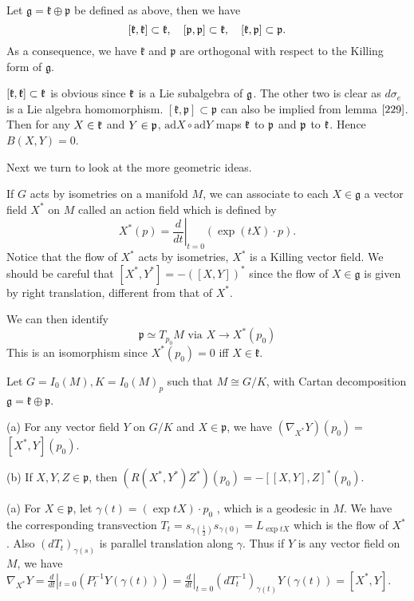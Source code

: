 \begin{proposition}
	Let $\mathfrak{g} = \mathfrak{k}\oplus\mathfrak{p}$ be
	defined as above, then we have
	\[
	[\mathfrak{k}, {\mathfrak k}] \subset \mathfrak{k},
	\quad[\mathfrak{p}, \mathfrak{p}] \subset \mathfrak{k},
	\quad[\mathfrak{k}, \mathfrak{p}] \subset \mathfrak{p}.
	\]
	As a consequence, we have $\mathfrak{k}$ and $\mathfrak{p}$
	are orthogonal with respect to the Killing
	form of $\mathfrak{g}$. 
\end{proposition}
\bproof
$[\mathfrak{k}, {\mathfrak k}] \subset \mathfrak{k}$ is obvious since
${\mathfrak k}$ is a Lie subalgebra of ${\mathfrak g}$. The other two is clear as
$d\sigma_{e}$ is a Lie algebra homomorphism. $[\mathfrak{k},
\mathfrak{p}] \subset \mathfrak{p}$ can also be implied from
lemma $\ref{229}$.  Then for any $X\in {\mathfrak k}$ and $Y\in {\mathfrak p}$,
$\mathrm{ad}X \circ \mathrm{ad}Y$ maps ${\mathfrak k}$ to ${\mathfrak p}$ and
${\mathfrak p}$ to ${\mathfrak k}$. Hence $B(X, Y) = 0$.
\eproof

Next we turn to look at the more geometric ideas.

If $G$ acts by isometries on a manifold $M$, we can associate to
each $X \in \mathfrak{g}$ a vector field $X^{*}$ on $M$ called an
action field which is defined by
\[
X^{*}(p) = \left.\frac{d}{d t}\right|_{t=0}(\exp (t X) \cdot p) .
\]
Notice that the flow of $X^*$ acts by isometries, $X^*$ is a
Killing vector field. We should be careful that $\left[X^{*},
Y^{*}\right] = -([X, Y])^{*}$ since  the flow of $X \in
\mathfrak{g}$ is given by right translation, different from that
of $X^*$. 

We can then identify
\[
\mathfrak{p} \simeq T_{p_{0}} M \text { via } X \rightarrow
X^{*}\left(p_{0}\right)
\]
This is an isomorphism since $X^{*}\left(p_{0}\right) = 0$ iff $X
\in \mathfrak{k}$.

\begin{proposition}\label{geo}
	Let $G = I_0(M), K = I_0(M)_p$ such that $M\cong G/K$, with
	Cartan decomposition $\mathfrak{g} = \mathfrak{k} \oplus
	\mathfrak{p}$.
	
	(a) For any vector field $Y$ on $G / K$ and $X \in
	\mathfrak{p}$, we have $\left( \nabla_{X^*}  Y \right)\left(
	p_{0} \right)=$
	$\left[ X^{*}, Y \right]\left( p_{0} \right) .$
	
	(b) If $X, Y, Z \in \mathfrak{p}$, then $\left( R\left(
	X^{*}, Y^{*} \right) Z^{*} \right)\left( p_{0} \right)=-[[X,
	Y], Z]^{*}\left( p_{0} \right)$.
\end{proposition}
\bproof
(a) For $X \in \mathfrak{p}$, let $\gamma(t)=(\exp t X) \cdot
p_{0}$ , which is a geodesic in $M$. We have the corresponding
transvection $T_{t}=s_{\gamma(\frac{1}{2})} s_{\gamma(0)} =
{L_{\exp t X}}$ which is the flow of $X^*$.  Also $\left(d
T_{t}\right)_{\gamma(s)}$
 is parallel translation along $\gamma$.  Thus if $ Y$  is any
 vector field on $M$, we have  $\nabla_{X^*} Y = \frac{d}{d
 t}|_{t=0} \left( P_{t}^{-1} Y(\gamma(t)) \right) = \frac{d}{d
 t}|_{t=0}\left( d T_{t}^{-1} \right)_{\gamma(t)}
 Y(\gamma(t))=\left[ X^{*}, Y \right]$.
 
